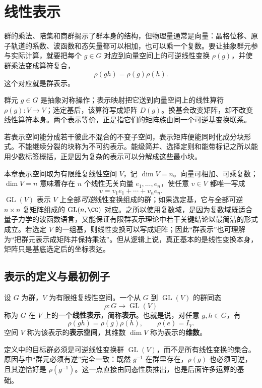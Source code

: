\chapter{线性表示}
\label{chap:representation-theory}

群的乘法、陪集和商群揭示了群本身的结构，但物理量通常是向量：晶格位移、原子轨道的系数、波函数和态矢量都可以相加，也可以乘一个复数。要让抽象群元参与实际计算，就要把每个 $g\in G$ 对应到向量空间上的可逆线性变换 $\rho(g)$，并使群乘法变成算符复合，
\[
\rho(gh)=\rho(g)\rho(h).
\]
这个对应就是群表示。

群元 $g\in G$ 是抽象对称操作；表示映射把它送到向量空间上的线性算符 $\rho(g):V\to V$；选定基后，该算符写成矩阵 $D(g)$。换基会改变矩阵，却不改变线性算符本身。两个表示等价，正是指它们的矩阵族由同一个可逆基变换联系。

若表示空间能分成若干彼此不混合的不变子空间，表示矩阵便能同时化成分块形式。不能继续分裂的块称为不可约表示。能级简并、选择定则和能带标记之所以能用少数标签概括，正是因为复杂的表示可以分解成这些最小块。

本章表示空间取为有限维复线性空间 $V$，记 $\dim V=n$。向量可相加、可乘复数；$\dim V=n$ 意味着存在 $n$ 个线性无关向量 $e_1,\dots,e_n$，使任意 $v\in V$ 都唯一写成
\[
v=v_1e_1+\cdots+v_ne_n.
\]
$\operatorname{GL}(V)$ 表示 $V$ 上全部\emph{可逆}线性变换组成的群；如果选定基，它与全部可逆 $n\times n$ 复矩阵组成的 $\operatorname{GL}(n,\CC)$ 对应。之所以使用复数域，是因为复数域既适合量子力学的波函数语言，又能保证有限群表示理论中若干关键结论以最简洁的形式成立。若选定 $V$ 的一组基，则线性变换可以写成矩阵；因此“群表示”也可理解为“把群元表示成矩阵并保持乘法”。但从逻辑上说，真正基本的是线性变换本身，矩阵只是基底选定后的坐标表达。
\section{表示的定义与最初例子}
\label{sec:representations-basic}


\begin{definition}[群表示]
设 $G$ 为群，$V$ 为有限维复线性空间。一个从 $G$ 到 $\operatorname{GL}(V)$ 的群同态
\[
\rho:G\longrightarrow \operatorname{GL}(V)
\]
称为 $G$ 在 $V$ 上的一个\textbf{线性表示}，简称\textbf{表示}。也就是说，对任意 $g,h\in G$，有
\[
\rho(gh)=\rho(g)\rho(h),
\qquad
\rho(e)=I_V.
\]
空间 $V$ 称为该表示的\textbf{表示空间}，其维数 $\dim V$ 称为表示的\textbf{维数}。
\label{def:representation}
\end{definition}

定义中的目标群必须是可逆线性变换群 $\operatorname{GL}(V)$，而不是所有线性变换的集合。原因与中“群元必须有逆”完全一致：既然 $g^{-1}$ 在群里存在，$\rho(g)$ 也必须可逆，且其逆恰好是 $\rho(g^{-1})$。这一点直接由同态性质推出，也是后面许多运算的基础。

